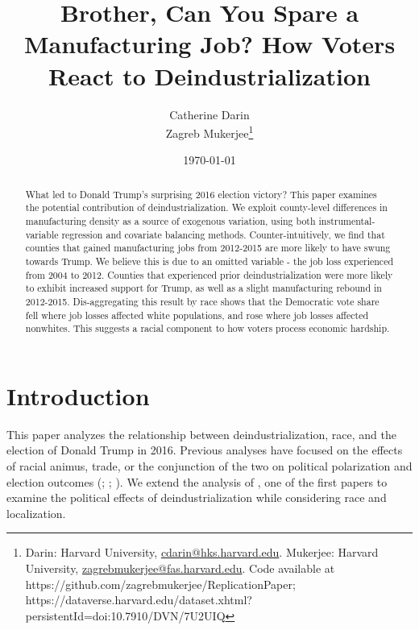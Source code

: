 \documentclass[]{AEA}
\begin{document}
\title{Brother, Can You Spare a Manufacturing Job? How Voters React to
Deindustrialization}


\author{
  Catherine Darin\\
  Zagreb Mukerjee\thanks{
  Darin: Harvard
University, \href{mailto:cdarin@hks.harvard.edu}{cdarin@hks.harvard.edu}.
  Mukerjee: Harvard
University, \href{mailto:zagrebmukerjee@fas.harvard.edu}{zagrebmukerjee@fas.harvard.edu}.
  Code available at https://github.com/zagrebmukerjee/ReplicationPaper;
  https://dataverse.harvard.edu/dataset.xhtml?persistentId=doi:10.7910/DVN/7U2UIQ
}
}

\date{\today}
\pubVolume{}
\pubIssue{}
\JEL{}
\Keywords{}

\begin{abstract}
What led to Donald Trump's surprising 2016 election victory? This paper
examines the potential contribution of deindustrialization. We exploit
county-level differences in manufacturing density as a source of
exogenous variation, using both instrumental-variable regression and
covariate balancing methods. Counter-intuitively, we find that counties
that gained manufacturing jobs from 2012-2015 are more likely to have
swung towards Trump. We believe this is due to an omitted variable - the
job loss experienced from 2004 to 2012. Counties that experienced prior
deindustrialization were more likely to exhibit increased support for
Trump, as well as a slight manufacturing rebound in 2012-2015.
Dis-aggregating this result by race shows that the Democratic vote share
fell where job losses affected white populations, and rose where job
losses affected nonwhites. This suggests a racial component to how
voters process economic hardship.
\end{abstract}


\maketitle

\section{Introduction} 
\label{Introduction}

This paper analyzes the relationship between deindustrialization, race,
and the election of Donald Trump in 2016. Previous analyses have focused
on the effects of racial animus, trade, or the conjunction of the two on
political polarization and election outcomes (\cite{Autor20};
\cite{Che16}; \cite{BR21}). We extend the analysis of \cite{Baccini21},
one of the first papers to examine the political effects of
deindustrialization while considering race and localization.
\end{document}
